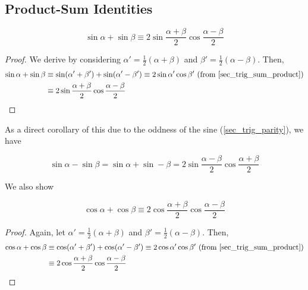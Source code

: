 \subsection{Product-Sum Identities} \label{sec_trig_product_sum}


\begin{theorem}
\begin{equation*}
\sin \alpha + \sin \beta \equiv
    2 \sin \frac{\alpha + \beta}2 \cos \frac{\alpha - \beta}2
\end{equation*}
\end{theorem}
\begin{proof}
We derive by considering \(\alpha' = \frac 12 (\alpha + \beta)\) and
\(\beta' = \frac 12 (\alpha - \beta)\). Then,
\begin{align*}
\sin \alpha + \sin \beta &\equiv
 \sin(\alpha' + \beta') + \sin(\alpha' - \beta') \equiv
 2\sin \alpha' \cos \beta'\ \text{(from \ref{sec_trig_sum_product})}
\\&\equiv 2 \sin \frac{\alpha + \beta}2 \cos \frac{\alpha - \beta} 2
    \qedhere
\end{align*}
\end{proof}
As a direct corollary of this due to the oddness of the sine
(\ref{sec_trig_parity}), we have
\begin{theorem}
\begin{equation*}
\sin \alpha - \sin \beta =
    \sin \alpha + \sin -\beta =
    2 \sin \frac{\alpha - \beta} 2 \cos\frac{\alpha + \beta} 2
\end{equation*}
\end{theorem}
We also show
\begin{theorem}
\begin{equation*}
\cos \alpha + \cos \beta \equiv
    2 \cos\frac{\alpha + \beta} 2 \cos \frac{\alpha - \beta} 2
\end{equation*}
\end{theorem}
\begin{proof}
Again, let \(\alpha' = \frac 12 (\alpha + \beta)\) and
\(\beta' = \frac 12 (\alpha - \beta)\). Then,
\begin{align*}
 \cos \alpha + \cos \beta &\equiv
 \cos(\alpha' + \beta') + \cos(\alpha' - \beta') \equiv
 2\cos \alpha' \cos \beta'\ \text{(from \ref{sec_trig_sum_product})}
 \\&\equiv 2 \cos\frac{\alpha + \beta} 2 \cos \frac{\alpha - \beta} 2
    \qedhere
\end{align*}
\end{proof}
